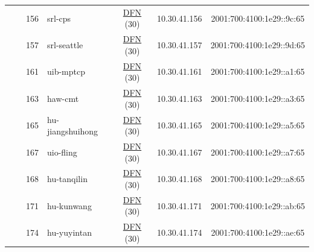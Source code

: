 \begin{small}
\begin{center}
\begin{longtable}{|c|c|c|c|c|c|c|c|}
  &  & \tiny{156} & \multicolumn{1}{|l|}{\tiny{srl-cps}} & \multicolumn{2}{|c|}{\tiny{\href{https://www.dfn.de}{DFN} (30)}} & \tiny{10.30.41.156} & \tiny{2001:700:4100:1e29::9c:65} \\* \cline{3-3}\cline{4-4}\cline{5-5}\cline{6-6}\cline{7-7}\cline{8-8}
  &  & \tiny{157} & \multicolumn{1}{|l|}{\tiny{srl-seattle}} & \multicolumn{2}{|c|}{\tiny{\href{https://www.dfn.de}{DFN} (30)}} & \tiny{10.30.41.157} & \tiny{2001:700:4100:1e29::9d:65} \\* \cline{3-3}\cline{4-4}\cline{5-5}\cline{6-6}\cline{7-7}\cline{8-8}
  &  & \tiny{161} & \multicolumn{1}{|l|}{\tiny{uib-mptcp}} & \multicolumn{2}{|c|}{\tiny{\href{https://www.dfn.de}{DFN} (30)}} & \tiny{10.30.41.161} & \tiny{2001:700:4100:1e29::a1:65} \\* \cline{3-3}\cline{4-4}\cline{5-5}\cline{6-6}\cline{7-7}\cline{8-8}
  &  & \tiny{163} & \multicolumn{1}{|l|}{\tiny{haw-cmt}} & \multicolumn{2}{|c|}{\tiny{\href{https://www.dfn.de}{DFN} (30)}} & \tiny{10.30.41.163} & \tiny{2001:700:4100:1e29::a3:65} \\* \cline{3-3}\cline{4-4}\cline{5-5}\cline{6-6}\cline{7-7}\cline{8-8}
  &  & \tiny{165} & \multicolumn{1}{|l|}{\tiny{hu-jiangshuihong}} & \multicolumn{2}{|c|}{\tiny{\href{https://www.dfn.de}{DFN} (30)}} & \tiny{10.30.41.165} & \tiny{2001:700:4100:1e29::a5:65} \\* \cline{3-3}\cline{4-4}\cline{5-5}\cline{6-6}\cline{7-7}\cline{8-8}
  &  & \tiny{167} & \multicolumn{1}{|l|}{\tiny{uio-fling}} & \multicolumn{2}{|c|}{\tiny{\href{https://www.dfn.de}{DFN} (30)}} & \tiny{10.30.41.167} & \tiny{2001:700:4100:1e29::a7:65} \\* \cline{3-3}\cline{4-4}\cline{5-5}\cline{6-6}\cline{7-7}\cline{8-8}
  &  & \tiny{168} & \multicolumn{1}{|l|}{\tiny{hu-tanqilin}} & \multicolumn{2}{|c|}{\tiny{\href{https://www.dfn.de}{DFN} (30)}} & \tiny{10.30.41.168} & \tiny{2001:700:4100:1e29::a8:65} \\* \cline{3-3}\cline{4-4}\cline{5-5}\cline{6-6}\cline{7-7}\cline{8-8}
  &  & \tiny{171} & \multicolumn{1}{|l|}{\tiny{hu-kunwang}} & \multicolumn{2}{|c|}{\tiny{\href{https://www.dfn.de}{DFN} (30)}} & \tiny{10.30.41.171} & \tiny{2001:700:4100:1e29::ab:65} \\* \cline{3-3}\cline{4-4}\cline{5-5}\cline{6-6}\cline{7-7}\cline{8-8}
  &  & \tiny{174} & \multicolumn{1}{|l|}{\tiny{hu-yuyintan}} & \multicolumn{2}{|c|}{\tiny{\href{https://www.dfn.de}{DFN} (30)}} & \tiny{10.30.41.174} & \tiny{2001:700:4100:1e29::ae:65} \\* \cline{3-3}\cline{4-4}\cline{5-5}\cline{6-6}\cline{7-7}\cline{8-8}

\end{longtable}
\end{center}
\end{small}
